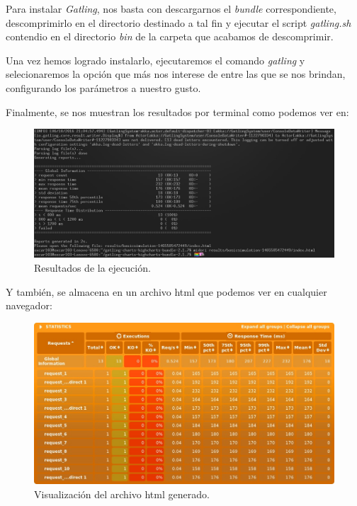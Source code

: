 \documentclass[paper=a4, fontsize=11pt]{scrartcl} %
\numberwithin{equation}{section} %
\numberwithin{figure}{section} %
\numberwithin{table}{section} %
\begin{document}
\begin{enumerate}
		Para instalar \textit{Gatling}, nos basta con descargarnos el \textit{bundle} correspondiente,
		descomprimirlo en el directorio destinado a tal fin y ejecutar el script \textit{gatling.sh}
		contendio en el directorio \textit{bin} de la carpeta que acabamos de descomprimir.
		
		Una vez hemos logrado instalarlo, ejecutaremos el comando \textit{gatling} y selecionaremos
		la opción que más nos interese de entre las que se nos brindan, configurando los parámetros
		a nuestro gusto.
		
		Finalmente, se nos muestran los resultados por terminal como podemos ver en:
		
		\begin{figure}[H]
			\centering
			\includegraphics[width=15cm]{Ejercicio_5a.jpg}
			\caption{Resultados de la ejecución.}
			\label{fig:gatling_terminal}
		\end{figure}
		
		Y también, se almacena en un archivo html que podemos ver en cualquier navegador:
		
		\begin{figure}[H]
			\centering
			\includegraphics[width=15cm]{Ejercicio_5b.jpg}
			\caption{Visualización del archivo html generado.}
			\label{fig:gatling_web}
		\end{figure}
		

\end{enumerate}
\end{document}
